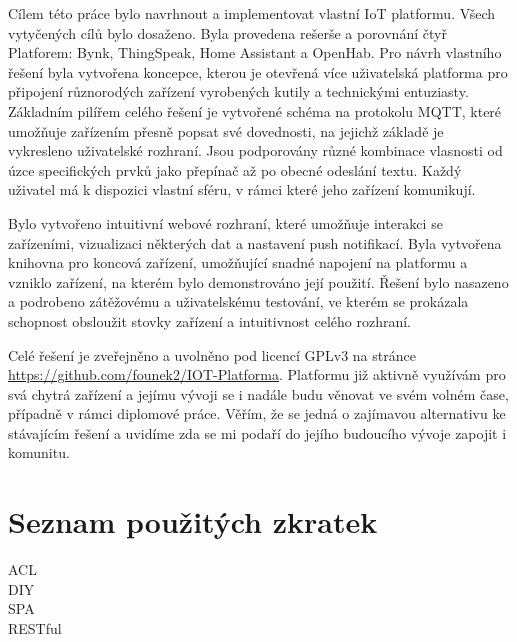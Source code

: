 \documentclass[thesis=B,czech]{FITthesis}[2019/12/23]
\begin{document}
\begin{conclusion}
    Cílem této práce bylo navrhnout a implementovat vlastní IoT platformu. Všech vytyčených cílů bylo dosaženo. Byla provedena rešerše a porovnání čtyř Platforem: Bynk, ThingSpeak, Home Assistant a OpenHab. Pro návrh vlastního řešení byla vytvořena koncepce, kterou je otevřená více uživatelská platforma pro připojení různorodých zařízení vyrobených kutily a technickými entuziasty. Základním pilířem celého řešení je vytvořené schéma na protokolu MQTT, které umožňuje zařízením přesně popsat své dovednosti, na jejichž základě je vykresleno uživatelské rozhraní. Jsou podporovány různé kombinace vlasnosti od úzce specifických prvků jako přepínač až po obecné odeslání textu. Každý uživatel má k dispozici vlastní sféru, v rámci které jeho zařízení komunikují.

    Bylo vytvořeno intuitivní webové rozhraní, které umožňuje interakci se zařízeními, vizualizaci některých dat a nastavení push notifikací. Byla vytvořena knihovna pro koncová zařízení, umožňující snadné napojení na platformu a vzniklo zařízení, na kterém bylo demonstrováno její použití. Řešení bylo nasazeno a podrobeno zátěžovému a uživatelskému testování, ve kterém se prokázala schopnost obsloužit stovky zařízení a intuitivnost celého rozhraní.

    Celé řešení je zveřejněno a uvolněno pod licencí GPLv3 na stránce \url{https://github.com/founek2/IOT-Platforma}. Platformu již aktivně využívám pro svá chytrá zařízení a jejímu vývoji se i nadále budu věnovat ve svém volném čase, případně v rámci diplomové práce. Věřím, že se jedná o zajímavou alternativu ke stávajícím řešení a uvidíme zda se mi podaří do jejího budoucího vývoje zapojit i komunitu.
\end{conclusion}




\appendix

\chapter{Seznam použitých zkratek}
\begin{description}
    \item[ACL]
    \item[DIY]
    \item[SPA]
    \item[RESTful]
\end{description}
\end{document}
